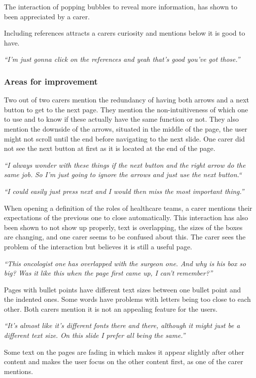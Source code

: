 \documentclass{sigchi}
\begin{document}
The interaction of popping bubbles to reveal more information, has shown to been appreciated by a carer.

Including references attracts a carers curiosity and mentions below it is good to have.

\textit{“I’m just gonna click on the references and yeah that’s good you’ve got those.”}

\subsubsection{Areas for improvement}
Two out of two carers mention the redundancy of having both arrows and a next button to get to the next page. They mention the non-intuitiveness of which one to use and to know if these actually have the same function or not. They also mention the downside of the arrows, situated in the middle of the page, the user might not scroll until the end before navigating to the next slide. One carer did not see the next button at first as it is located at the end of the page.

\textit{“I always wonder with these things if the next button and the right arrow do the same job. So I’m just going to ignore the arrows and just use the next button.“}

\textit{“I could easily just press next and I would then miss the most important thing.”}

When opening a definition of the roles of healthcare teams, a carer mentions their expectations of the previous one to close automatically. This interaction has also been shown to not show up properly, text is overlapping, the sizes of the boxes are changing, and one carer seems to be confused about this. The carer sees the problem of the interaction but believes it is still a useful page.

\textit{“This oncologist one has overlapped with the surgeon one. And why is his box so big? Was it like this when the page first came up, I can’t remember?”}

Pages with bullet points have different text sizes between one bullet point and the indented ones. Some words have problems with letters being too close to each other. Both carers mention it is not an appealing feature for the users.

\textit{“It’s almost like it’s different fonts there and there, although it might just be a different text size. On this slide I prefer all being the same.”}

Some text on the pages are fading in which makes it appear slightly after other content and makes the user focus on the other content first, as one of the carer mentions.
\end{document}
